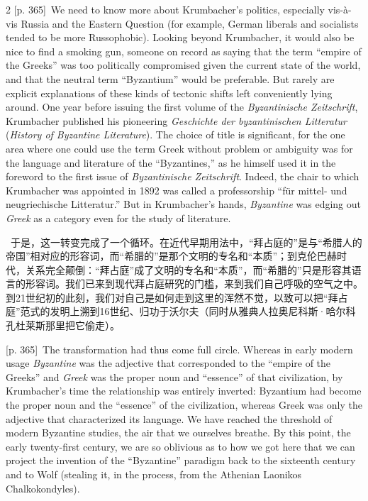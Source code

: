 \documentclass[10pt,a4paper]{article}
\begin{document}
\begin{paracol}{2}
\switchcolumn
{\scriptsize\color{gray}[p. 365]}\ We need to know more about Krumbacher’s politics, especially vis-à-vis Russia and the Eastern Question (for example, German liberals and socialists tended to be more Russophobic). Looking beyond Krumbacher, it would also be nice to find a smoking gun, someone on record as saying that the term “empire of the Greeks” was too politically compromised given the current state of the world, and that the neutral term “Byzantium” would be preferable. But rarely are explicit explanations of these kinds of tectonic shifts left conveniently lying around. One year before issuing the first volume of the \textit{Byzantinische Zeitschrift}, Krumbacher published his pioneering \textit{Geschichte der byzantinischen Litteratur} (\textit{History of Byzantine Literature}). The choice of title is significant, for the one area where one could use the term Greek without problem or ambiguity was for the language and literature of the “Byzantines,” as he himself used it in the foreword to the first issue of \textit{Byzantinische Zeitschrift}. Indeed, the chair to which Krumbacher was appointed in 1892 was called a professorship “für mittel- und neugriechische Litteratur.” But in Krumbacher’s hands, \textit{Byzantine} was edging out \textit{Greek} as a category even for the study of literature.\par
\switchcolumn*
{\scriptsize\color{gray}[p. 365]}\ 于是，这一转变完成了一个循环。在近代早期用法中，“拜占庭的”是与“希腊人的帝国”相对应的形容词，而“希腊的”是那个文明的专名和“本质”；到克伦巴赫时代，关系完全颠倒：“拜占庭”成了文明的专名和“本质”，而“希腊的”只是形容其语言的形容词。我们已来到现代拜占庭研究的门槛，来到我们自己呼吸的空气之中。到21世纪初的此刻，我们对自己是如何走到这里的浑然不觉，以致可以把“拜占庭”范式的发明上溯到16世纪、归功于沃尔夫（同时从雅典人拉奥尼科斯·哈尔科孔杜莱斯那里把它偷走）。\par
\switchcolumn
{\scriptsize\color{gray}[p. 365]}\ The transformation had thus come full circle. Whereas in early modern usage \textit{Byzantine} was the adjective that corresponded to the “empire of the Greeks” and \textit{Greek} was the proper noun and “essence” of that civilization, by Krumbacher’s time the relationship was entirely inverted: Byzantium had become the proper noun and the “essence” of the civilization, whereas Greek was only the adjective that characterized its language. We have reached the threshold of modern Byzantine studies, the air that we ourselves breathe. By this point, the early twenty-first century, we are so oblivious as to how we got here that we can project the invention of the “Byzantine” paradigm back to the sixteenth century and to Wolf (stealing it, in the process, from the Athenian Laonikos Chalkokondyles).\par

\end{paracol}
\end{document}
